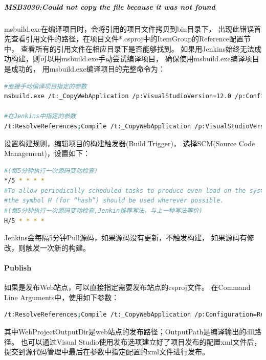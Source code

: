 \documentclass{book}
\begin{document}
\subparagraph{MSB3030:Could not copy the file because it was not found}

msbuild.exe在编译项目时，会将引用的项目文件拷贝到bin目录下，
出现此错误首先查看引用文件的路径，在项目文件*.csproj中的ItemGroup的Reference配置节中，
查看所有的引用文件在相应目录下是否能够找到。
如果用Jenkins始终无法成功构建，则可以用msbuild.exe手动尝试编译项目，
确保使用msbuild.exe编译项目是成功的，
用msbuild.exe编译项目的完整命令为：

\begin{lstlisting}[language=Bash]
#直接手动编译项目指定的参数
msbuild.exe /t:_CopyWebApplication /p:VisualStudioVersion=12.0 /p:Configuration=Release /p:outDir="E:\JenkinsPublish\Bin" "C:\Program Files (x86)\Jenkins\jobs\Tour\workspace\trunk\trunk\RR.Web.CCN.Tour\RR.Web.CCN.Tour.csproj"

#在Jenkins中指定的参数
/t:ResolveReferences;Compile /t:_CopyWebApplication /p:VisualStudioVersion=12.0 /p:Configuration=Release /p:WebProjectOutputDir=E:\Web\RR.Web.CCN.Tour\1.0.1 /p:OutputPath=E:\JenkinsPublish\Bin
\end{lstlisting}

设置构建规则，编辑项目的构建触发器(Build Trigger)，
选择SCM(Source Code Management)，设置如下：

\begin{lstlisting}[language=Bash]
#(每5分钟执行一次源码变动检查)
*/5 * * * *
#To allow periodically scheduled tasks to produce even load on the system
#the symbol H (for “hash”) should be used wherever possible. 
#(每5分钟执行一次源码变动检查,Jenkin推荐写法，与上一种写法等价)
H/5 * * * *
\end{lstlisting}

Jenkins会每隔5分钟Pull源码，如果源码没有更新，不触发构建，
如果源码有修改，则触发一次新的构建。


\paragraph{Publish}

如果是发布Web站点，可以直接指定需要发布站点的csproj文件。
在Command Line Arguments中，使用如下参数：

\begin{lstlisting}[language=Bash]
/t:ResolveReferences;Compile /t:_CopyWebApplication /p:Configuration=Release /p:WebProjectOutputDir=C:\Jenkins_Publish /p:OutputPath=C:\Jenkins_Publish\bin  
\end{lstlisting}

其中WebProjectOutputDir是web站点的发布路径；OutputPath是编译输出的dll路径。
也可以通过Visual Studio使用发布选项建立好了项目发布的配置xml文件后，
提交到源代码管理中最后在参数中指定配置的xml文件进行发布。
\end{document}
